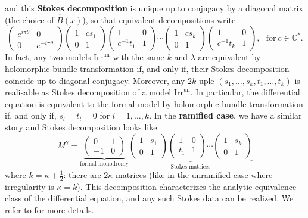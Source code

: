 \documentclass[12]{amsart}
\newcommand{\Irrun}{\boldsymbol{\mathrm{Irr}^{\mathrm{un}}}}
\begin{document}
and this {\bf Stokes decomposition} is unique up to conjugacy by a diagonal matrix (the choice of $\hat B(x)$), 
so that equivalent decompositions write
$$\begin{pmatrix}e^{i\pi\theta}&0\\ 0&e^{-i\pi\theta}\end{pmatrix}
\begin{pmatrix}1&cs_1\\ 0&1\end{pmatrix}\begin{pmatrix}1&0\\ c^{-1}t_1&1\end{pmatrix}\cdots
\begin{pmatrix}1&cs_k\\ 0&1\end{pmatrix}\begin{pmatrix}1&0\\ c^{-1}t_k&1\end{pmatrix},\ \ \ \text{for}\ c\in\mathbb C^*.$$
In fact, any two models $\Irrun$ with the same $k$ and $\lambda$
are equivalent by holomorphic bundle transformation if, and only if, their Stokes decomposition coincide up to diagonal conjugacy.
Moreover, any $2k$-uple $(s_1,\ldots,s_k,t_1,\ldots,t_k)$ is realisable as Stokes decomposition of a model $\Irrun$.
In particular, the differential equation is equivalent to the formal model by holomorphic bundle transformation
if, and only if, $s_l=t_l=0$ for $l=1,\ldots,k$.
In the {\bf ramified case}, we have a similar story and Stokes decomposition looks like 
\begin{equation}\label{eq:ramStokesDecomp}
M^\gamma=\underbrace{
\begin{pmatrix}0&1\\ -1&0\end{pmatrix}}_{\text{formal monodromy}}
\underbrace{\begin{pmatrix}1&s_1\\ 0&1\end{pmatrix}\begin{pmatrix}1&0\\ t_1&1\end{pmatrix}\cdots
\begin{pmatrix}1&s_k\\ 0&1\end{pmatrix}}_{\text{Stokes matrices}}
\end{equation}
where $k=\kappa+\frac{1}{2}$: there are $2\kappa$ matrices (like in the unramified case where irregularity is $\kappa=k$). 
This decomposition characterizes the analytic equivalence class of the differential 
equation, and any such Stokes data can be realized. We refer to \cite{MR,MRGalois,Krichever,BMM,vdPS} for more details.
\end{document}
